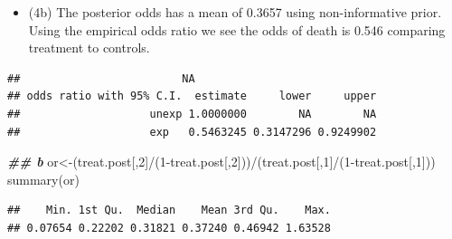 \documentclass[
]{book}
\newenvironment{Shaded}{\begin{snugshade}}{\end{snugshade}}
\newcommand{\AttributeTok}[1]{\textcolor[rgb]{0.77,0.63,0.00}{#1}}
\newcommand{\DecValTok}[1]{\textcolor[rgb]{0.00,0.00,0.81}{#1}}
\newcommand{\DocumentationTok}[1]{\textcolor[rgb]{0.56,0.35,0.01}{\textbf{\textit{#1}}}}
\newcommand{\FunctionTok}[1]{\textcolor[rgb]{0.00,0.00,0.00}{#1}}
\newcommand{\NormalTok}[1]{#1}
\newcommand{\OtherTok}[1]{\textcolor[rgb]{0.56,0.35,0.01}{#1}}
\newcommand{\SpecialCharTok}[1]{\textcolor[rgb]{0.00,0.00,0.00}{#1}}
\newcommand{\StringTok}[1]{\textcolor[rgb]{0.31,0.60,0.02}{#1}}
\providecommand{\tightlist}{%
  \setlength{\itemsep}{0pt}\setlength{\parskip}{0pt}}
\theoremstyle{definition}
\theoremstyle{definition}
\theoremstyle{definition}
\theoremstyle{definition}
\theoremstyle{remark}
\begin{document}
\begin{itemize}
\tightlist
\item
  (4b) The posterior odds has a mean of 0.3657 using non-informative prior. Using the empirical odds ratio we see the odds of death is 0.546 comparing treatment to controls.
\end{itemize}

\begin{Shaded}
\end{Shaded}

\begin{verbatim}
##                         NA
## odds ratio with 95% C.I.  estimate     lower     upper
##                    unexp 1.0000000        NA        NA
##                    exp   0.5463245 0.3147296 0.9249902
\end{verbatim}

\begin{Shaded}
\begin{Highlighting}[]
  \DocumentationTok{\#\# b}
\NormalTok{  or}\OtherTok{\textless{}{-}}\NormalTok{(treat.post[,}\DecValTok{2}\NormalTok{]}\SpecialCharTok{/}\NormalTok{(}\DecValTok{1}\SpecialCharTok{{-}}\NormalTok{treat.post[,}\DecValTok{2}\NormalTok{]))}\SpecialCharTok{/}\NormalTok{(treat.post[,}\DecValTok{1}\NormalTok{]}\SpecialCharTok{/}\NormalTok{(}\DecValTok{1}\SpecialCharTok{{-}}\NormalTok{treat.post[,}\DecValTok{1}\NormalTok{]))}
\FunctionTok{summary}\NormalTok{(or)}
\end{Highlighting}
\end{Shaded}

\begin{verbatim}
##    Min. 1st Qu.  Median    Mean 3rd Qu.    Max. 
## 0.07654 0.22202 0.31821 0.37240 0.46942 1.63528
\end{verbatim}
\end{document}
